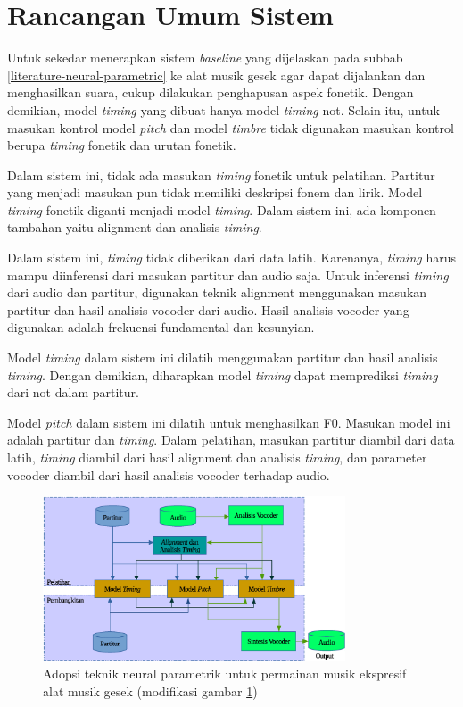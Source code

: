 \section{Rancangan Umum Sistem}

Untuk sekedar menerapkan sistem \textit{baseline} yang dijelaskan pada subbab \ref{literature-neural-parametric} ke alat musik gesek agar dapat dijalankan dan menghasilkan suara, cukup dilakukan penghapusan aspek fonetik. Dengan demikian, model \textit{timing} yang dibuat hanya model \textit{timing} not. Selain itu, untuk masukan kontrol model \textit{pitch} dan model \textit{timbre} tidak digunakan masukan kontrol berupa \textit{timing} fonetik dan urutan fonetik.

Dalam sistem ini, tidak ada masukan \textit{timing} fonetik untuk pelatihan. Partitur yang menjadi masukan pun tidak memiliki deskripsi fonem dan lirik. Model \textit{timing} fonetik diganti menjadi model \textit{timing}. Dalam sistem ini, ada komponen tambahan yaitu alignment dan analisis \textit{timing}.

Dalam sistem ini, \textit{timing} tidak diberikan dari data latih. Karenanya, \textit{timing} harus mampu diinferensi dari masukan partitur dan audio saja. Untuk inferensi \textit{timing} dari audio dan partitur, digunakan teknik alignment menggunakan masukan partitur dan hasil analisis vocoder dari audio. Hasil analisis vocoder yang digunakan adalah frekuensi fundamental dan kesunyian.

Model \textit{timing} dalam sistem ini dilatih menggunakan partitur dan hasil analisis \textit{timing}. Dengan demikian, diharapkan model \textit{timing} dapat memprediksi \textit{timing} dari not dalam partitur.

Model \textit{pitch} dalam sistem ini dilatih untuk menghasilkan F0. Masukan model ini adalah partitur dan \textit{timing}. Dalam pelatihan, masukan partitur diambil dari data latih, \textit{timing} diambil dari hasil alignment dan analisis \textit{timing}, dan parameter vocoder diambil dari hasil analisis vocoder terhadap audio.

\begin{figure}[h]
    \centering
    \includegraphics[width=0.8\textwidth]{resources/system-overview-baseline.eps}
    \caption{Adopsi teknik neural parametrik untuk permainan musik ekspresif alat musik gesek (modifikasi gambar \ref{fig-system-overview-baseline})}\label{fig-system-overview-baseline}
\end{figure}

